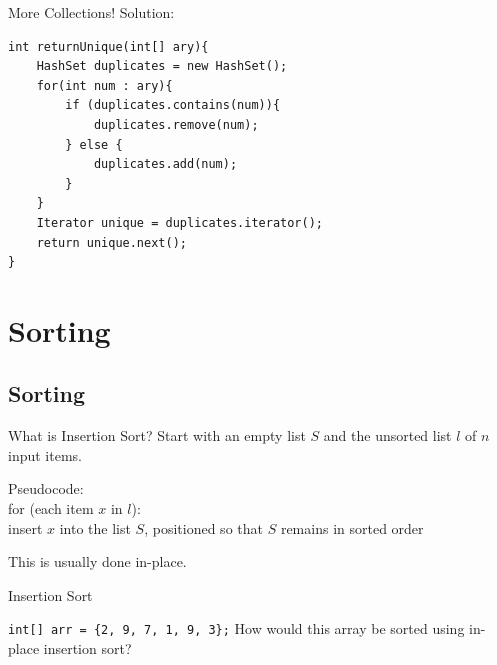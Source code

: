 \documentclass[9pt]{beamer}
\begin{document}
\begin{frame}[fragile]{\Huge{More Collections!}}
Solution:
\begin{lstlisting}
int returnUnique(int[] ary){
    HashSet duplicates = new HashSet();
    for(int num : ary){
        if (duplicates.contains(num)){
            duplicates.remove(num);
        } else {
            duplicates.add(num);
        }
    }
    Iterator unique = duplicates.iterator();
    return unique.next();
}
\end{lstlisting}
\end{frame}



\section{Sorting}
\subsection{Sorting}

\begin{frame}{What is Insertion Sort?}
Start with an empty list $S$ and the unsorted list $l$ of $n$ input items. \newline 

Pseudocode:\\
for (each item $x$ in $l$):\\
\hspace*{2em} insert $x$ into the list $S$, positioned so that $S$ remains in sorted order\newline 

This is usually done in-place.
\end{frame}

\begin{frame}{Insertion Sort}

{\tt int[] arr = \{2, 9, 7, 1, 9, 3\};} \newline
How would this array be sorted using in-place insertion sort? \newline

\\
\\
\\
\\
\\
\end{frame}
\end{document}
